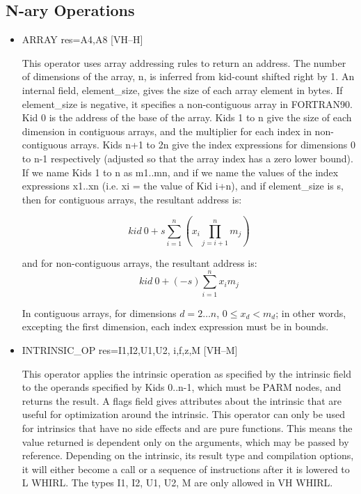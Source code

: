 \subsection{N-ary Operations}

\begin{itemize}
\item
{}%
ARRAY res=A4,A8 \hfill [VH--H]

This operator uses array addressing rules to return an address.
The number of dimensions of the array, n, is inferred from kid-count
shifted right
by 1. An internal field, element\_size, gives the size of
each array element in bytes. If element\_size is negative, it specifies
a non-contiguous array in FORTRAN90. Kid 0 is the address of the
base of the array. Kids 1 to n give the size of each dimension in
contiguous arrays, and the multiplier for each index in non-contiguous
arrays. Kids n+1 to 2n give the index expressions for dimensions 0
to n-1 respectively (adjusted so that the array index has a zero
lower bound). If we name Kids 1 to n as m1..mn, and if we name the
values of the index expressions x1..xn (i.e. xi = the value of Kid
i+n), and if element\_size is s, then for contiguous arrays, the
resultant address is:

\begin{displaymath}
kid~0 + s \sum^n_{i=1} \left( x_i \prod^n_{j=i+1} m_j\right)
\end{displaymath}

and for non-contiguous arrays, the resultant address is: 
\begin{displaymath}
kid~0 + (-s) \sum^n_{i=1} x_i  m_j
\end{displaymath}

In contiguous arrays, for dimensions $d=2\ldots n$, $0 \leq x_d < m_d$; 
in other words, excepting
the first dimension, each index expression must be in bounds. 

\item
{}%
INTRINSIC\_OP res=I1,I2,U1,U2, i,f,z,M  \hfill [VH--M]

This operator applies the intrinsic operation as specified by the
intrinsic field to the operands specified by Kids 0..n-1, which must
be
%
PARM nodes, and returns the result. A flags field gives attributes
about the intrinsic that are useful for optimization around the
intrinsic. This operator can only be used for intrinsics that have
no side effects and are pure functions. This means the value returned
is dependent only on the arguments, which may be passed by reference.
Depending on the intrinsic, its result type and compilation options,
it will either become a call or a sequence of instructions after it
is lowered to L WHIRL. The types I1, I2, U1, U2, M are only allowed
in VH WHIRL. 


\end{itemize}
